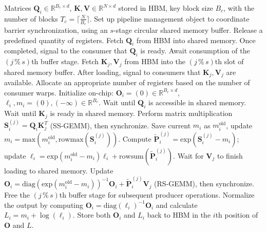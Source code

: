 \begin{algorithm}[H]
    \caption{\small\label{alg:flash3_wgmma_ws_only}\textsc{FlashAttention-3} forward pass \textbf{without} intra-consumer overlapping -- CTA view}
    \begin{algorithmic}[1]
\REQUIRE Matrices $\mathbf{Q}_i \in \mathbb{R}^{B_r \times d}$, $\mathbf{K}, \mathbf{V} \in \mathbb{R}^{N \times d}$ stored in HBM, key block size $B_c$, with the number of blocks $T_c = \lceil \frac{N}{B_c} \rceil$.
\STATE Set up pipeline management object to coordinate barrier synchronization, using an $s$-stage circular shared memory buffer.
\STATE Release a predefined quantity of registers.
\STATE Fetch $\mathbf{Q}_i$ from HBM into shared memory.
\STATE Once completed, signal to the consumer that $\mathbf{Q}_i$ is ready.
    \STATE Await consumption of the $(j\,\%\,s)$th buffer stage.
    \STATE Fetch $\mathbf{K}_j, \mathbf{V}_j$ from HBM into the $(j\,\%\,s)$th slot of shared memory buffer.
    \STATE After loading, signal to consumers that $\mathbf{K}_j, \mathbf{V}_j$ are available.
\ENDFOR
\ELSE 
\STATE Allocate an appropriate number of registers based on the number of consumer warps.
\STATE Initialize on-chip: $\mathbf{O}_i = (0) \in \mathbb{R}^{B_r \times d}$, $\ell_i, m_i = (0), (-\infty) \in \mathbb{R}^{B_r}$.
\STATE Wait until $\mathbf{Q}_i$ is accessible in shared memory.
\STATE Wait until $\mathbf{K}_j$ is ready in shared memory.
\STATE Perform matrix multiplication $\mathbf{S}_i^{(j)} = \mathbf{Q}_i \mathbf{K}_j^T$ (SS-GEMM), then synchronize. \label{alg:ws_only_gemm1}
\STATE Save current $m_i$ as $m_i^{\mathrm{old}}$, update $m_i = \mathrm{max}(m_i^{\mathrm{old}}, \mathrm{rowmax}(\mathbf{S}_i^{(j)}))$. \label{code-ws:softmax_start}
\STATE Compute $\widetilde{\mathbf{P}}_i^{(j)} = \mathrm{exp}(\mathbf{S}_i^{(j)} - m_i)$; update $\ell_i = \mathrm{exp}(m_i^{\mathrm{old}} - m_i) \ell_i + \mathrm{rowsum}(\widetilde{\mathbf{P}}_i^{(j)})$. \label{code-ws:softmax_end}
\STATE Wait for $\mathbf{V}_j$ to finish loading to shared memory.
\STATE Update $\mathbf{O}_i = \mathrm{diag}(\mathrm{exp}(m_i^{\mathrm{old}} - m_i))^{-1} \mathbf{O}_i + \widetilde{\mathbf{P}}_i^{(j)} \mathbf{V}_j$ (RS-GEMM), then synchronize. \label{alg:ws_only_gemm2}
\STATE Free the $(j\,\%\,s)$th buffer stage for subsequent producer operations.
\ENDFOR
\STATE Normalize the output by computing $\mathbf{O}_i = \mathrm{diag}(\ell_i)^{-1} \mathbf{O}_i$ and calculate $L_i = m_i + \log(\ell_i)$.
\STATE Store both $\mathbf{O}_i$ and $L_i$ back to HBM in the $i$th position of $\mathbf{O}$ and $L$.
\ENDIF
\end{algorithmic}
\end{algorithm}

